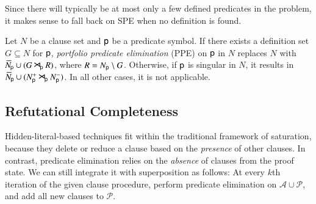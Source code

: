Since there will typically be at most only a few defined predicates in the
problem, it makes sense to fall back on SPE when no definition is found.

\begin{defi}
   Let $N$ be a clause set and $\cst{p}$ be a predicate symbol. If there exists a
   definition set $G \subseteq N$ for $\cst{p}$, \emph{portfolio predicate
   elimination} (PPE) on $\cst{p}$ in $N$ replaces $N$ with
   $\withoutpred{N}{\cst{p}} \cup (\confrep{\withpred{G}{\cst{p}}}{G} \flatres_{\!\cst{p}}
   \confrep{\withpred{R}{\cst{p}}}{R})$, where $R = \withpred{N}{\cst{p}} \setminus G$.
   Otherwise, if $\cst{p}$ is singular in $N$, it results in $\withoutpred{N}{\cst{p}}
   \cup (\withpredpos{N}{\cst{p}} \flatres_{\!\cst{p}} \withpredneg{N}{\cst{p}})$.
   In all other cases, it is not applicable.
\end{defi}

\subsection{Refutational Completeness}
\label{ssec:predicate-elimination-refutational-completeness}

\newcommand\FInf{\mathit{FInf}}
\newcommand\FLInf{\mathit{FLInf}}
\newcommand\Red{\mathit{Red}}
\newcommand\RedI{\Red_\mathrm{I}}
\newcommand\RedF{\Red_\mathrm{F}}
\newcommand\LRed{\mathit{LRed}}
\newcommand\LRedI{\LRed_\mathrm{I}}
\newcommand\LRedF{\LRed_\mathrm{F}}
\newcommand\gnd{\mathcalx{G}}
\newcommand\pow[1]{\mathcalx{pe}(#1)}
\newcommand\Lab{\mathbf{L}}
\newcommand\FFLab{{\mathbf{FL}}}
\newcommand\Inv{\mathit{Inv}}

\newcommand\RedWk{\smash{\Red\Wksup}}
\newcommand\RedIWk{\smash{\Red_\mathrm{I}\Wksup}}
\newcommand\RedFWk{\smash{\Red_\mathrm{F}\Wksup}}

\newcommand\Wksym{\flat}
\newcommand\Wksup{^\Wksym}
\newcommand\modelsWk{\models\Wksup}
\newcommand\modelsWkcapgnd{\modelsWk}
\newcommand\LRedWk{\LRed^{\Wksym}}
\newcommand\LRedWksub{\LRed^{\Wksym,\sqsupset}}
\newcommand\LRedFWksub{\LRedF^{\Wksym,\sqsupset}}
\newcommand\LRedIWk{\LRedI^{\Wksym}}
\newcommand\Wk[1]{#1^\Wksym}
\newcommand\prop{o}
\newcommand\true{\top}
\newcommand\false{\bot}

Hidden-literal-based techniques fit within the traditional framework of
saturation, because they delete or reduce a clause based on the \emph{presence}
of other clauses. In contrast, predicate elimination relies on the
\emph{absence} of clauses from the proof state. We can still integrate it with
superposition as follows: At every $k$th iteration of the given clause
procedure, perform predicate elimination on $\mathcal{A}
\cup \mathcal{P}$, and add all new clauses to $\mathcal{P}$.

